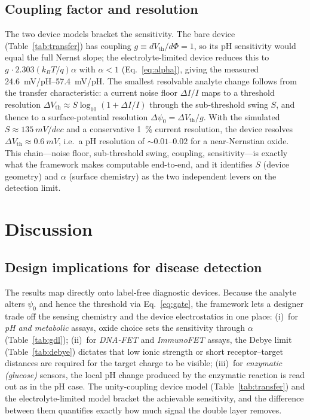 \documentclass[10pt,journal]{IEEEtran}
\begin{document}
\subsection{Coupling factor and resolution}
\label{sec:resolution}
The two device models bracket the sensitivity. The bare device
(Table~\ref{tab:transfer}) has coupling $g\equiv dV_{\mathrm{th}}/d\Phi=1$, so its
pH sensitivity would equal the full Nernst slope; the electrolyte-limited device
reduces this to $g\,\cdot 2.303(k_BT/q)\alpha$ with $\alpha<1$
(Eq.~\eqref{eq:alpha}), giving the measured \SIrange{24.6}{57.4}{mV/pH}. The
smallest resolvable analyte change follows from the transfer characteristic: a
current noise floor $\Delta I/I$ maps to a threshold resolution
$\Delta V_{\mathrm{th}}\approx S\log_{10}(1+\Delta I/I)$ through the sub-threshold
swing $S$, and thence to a surface-potential resolution
$\Delta\psi_0=\Delta V_{\mathrm{th}}/g$. With the simulated $S\approx\SI{135}{mV/dec}$
and a conservative \SI{1}{\percent} current resolution, the device resolves
$\Delta V_{\mathrm{th}}\approx\SI{0.6}{mV}$, i.e.\ a pH resolution of
$\sim\!0.01$--$0.02$ for a near-Nernstian oxide. This chain---noise floor,
sub-threshold swing, coupling, sensitivity---is exactly what the framework makes
computable end-to-end, and it identifies $S$ (device geometry) and $\alpha$
(surface chemistry) as the two independent levers on the detection limit.

\section{Discussion}
\label{sec:discussion}

\subsection{Design implications for disease detection}
The results map directly onto label-free diagnostic devices. Because the analyte
alters $\psi_0$ and hence the threshold via Eq.~\eqref{eq:gate}, the framework
lets a designer trade off the sensing chemistry and the device electrostatics in
one place: (i)~for \emph{pH and metabolic} assays, oxide choice sets the
sensitivity through $\alpha$ (Table~\ref{tab:gdl}); (ii)~for \emph{DNA-FET} and
\emph{ImmunoFET} assays, the Debye limit (Table~\ref{tab:debye}) dictates that
low ionic strength or short receptor--target distances are required for the
target charge to be visible; (iii)~for \emph{enzymatic (glucose)} sensors, the
local pH change produced by the enzymatic reaction is read out as in the pH case.
The unity-coupling device model (Table~\ref{tab:transfer}) and the
electrolyte-limited model bracket the achievable sensitivity, and the difference
between them quantifies exactly how much signal the double layer removes.
\end{document}
